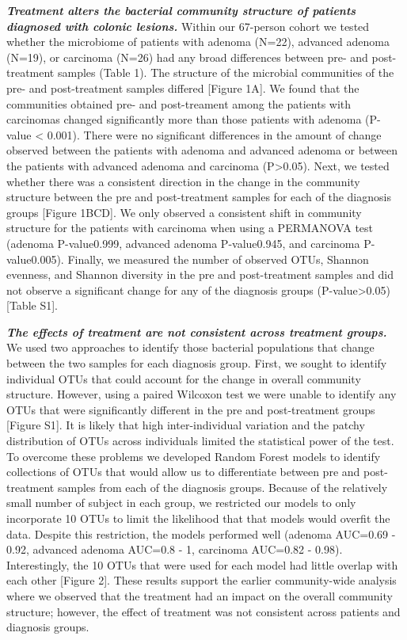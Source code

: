 \documentclass[12pt,]{article}
\begin{document}
\textbf{\emph{Treatment alters the bacterial community structure of
patients diagnosed with colonic lesions.}} Within our 67-person cohort
we tested whether the microbiome of patients with adenoma (N=22),
advanced adenoma (N=19), or carcinoma (N=26) had any broad differences
between pre- and post-treatment samples (Table 1). The structure of the
microbial communities of the pre- and post-treatment samples differed
{[}Figure 1A{]}. We found that the communities obtained pre- and
post-treament among the patients with carcinomas changed significantly
more than those patients with adenoma (P-value \textless{} 0.001). There
were no significant differences in the amount of change observed between
the patients with adenoma and advanced adenoma or between the patients
with advanced adenoma and carcinoma (P\textgreater{}0.05). Next, we
tested whether there was a consistent direction in the change in the
community structure between the pre and post-treatment samples for each
of the diagnosis groups {[}Figure 1BCD{]}. We only observed a consistent
shift in community structure for the patients with carcinoma when using
a PERMANOVA test (adenoma P-value0.999, advanced adenoma P-value0.945,
and carcinoma P-value0.005). Finally, we measured the number of observed
OTUs, Shannon evenness, and Shannon diversity in the pre and
post-treatment samples and did not observe a significant change for any
of the diagnosis groups (P-value\textgreater{}0.05) {[}Table S1{]}.

\textbf{\emph{The effects of treatment are not consistent across
treatment groups.}} We used two approaches to identify those bacterial
populations that change between the two samples for each diagnosis
group. First, we sought to identify individual OTUs that could account
for the change in overall community structure. However, using a paired
Wilcoxon test we were unable to identify any OTUs that were
significantly different in the pre and post-treatment groups {[}Figure
S1{]}. It is likely that high inter-individual variation and the patchy
distribution of OTUs across individuals limited the statistical power of
the test. To overcome these problems we developed Random Forest models
to identify collections of OTUs that would allow us to differentiate
between pre and post-treatment samples from each of the diagnosis
groups. Because of the relatively small number of subject in each group,
we restricted our models to only incorporate 10 OTUs to limit the
likelihood that that models would overfit the data. Despite this
restriction, the models performed well (adenoma AUC=0.69 - 0.92,
advanced adenoma AUC=0.8 - 1, carcinoma AUC=0.82 - 0.98). Interestingly,
the 10 OTUs that were used for each model had little overlap with each
other {[}Figure 2{]}. These results support the earlier community-wide
analysis where we observed that the treatment had an impact on the
overall community structure; however, the effect of treatment was not
consistent across patients and diagnosis groups.
\end{document}
